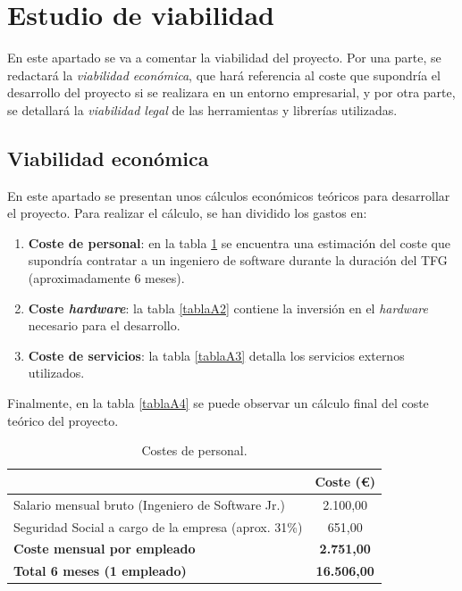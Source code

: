 \section{Estudio de viabilidad}
\label{sec:plan_viabilidad}
En este apartado se va a comentar la viabilidad del proyecto. Por una parte, se redactará la \emph{viabilidad económica}, que hará referencia al coste que supondría el desarrollo del proyecto si se realizara en un entorno empresarial, y por otra parte, se detallará la \emph{viabilidad legal} de las herramientas y librerías utilizadas.

\subsection{Viabilidad económica}
En este apartado se presentan unos cálculos económicos teóricos para desarrollar el proyecto. Para realizar el cálculo, se han dividido los gastos en:
\begin{enumerate}
    \item \textbf{Coste de personal}: en la tabla \ref{tablaA1} se encuentra una estimación del coste que supondría contratar a un ingeniero de software durante la duración del TFG (aproximadamente 6 meses).
    \item \textbf{Coste \textit{hardware}}: la tabla \ref{tablaA2} contiene la inversión en el \textit{hardware} necesario para el desarrollo.
    \item \textbf{Coste de servicios}: la tabla \ref{tablaA3} detalla los servicios externos utilizados.
\end{enumerate}
Finalmente, en la tabla \ref{tablaA4} se puede observar un cálculo final del coste teórico del proyecto.

\begin{table}[H]
    \centering
    \begin{tabular}{lc}
        \hline
        \rowcolor[HTML]{EFEFEF} 
        \multicolumn{1}{c}{\cellcolor[HTML]{EFEFEF}\textbf{Concepto}} & \textbf{Coste (€)} \\ \hline
        \rowcolor[HTML]{ECF4FF} 
        Salario mensual bruto (Ingeniero de Software Jr.) \cite{salariales_tic} & 2.100,00 \\
        \rowcolor[HTML]{EFEFEF} 
        Seguridad Social a cargo de la empresa (aprox. 31\%) & 651,00 \\ \hline
        \rowcolor[HTML]{ECF4FF} 
        \textbf{Coste mensual por empleado} & \textbf{2.751,00} \\ \hline
        \rowcolor[HTML]{EFEFEF} 
        \textbf{Total 6 meses (1 empleado)} & \textbf{16.506,00} \\ \hline
    \end{tabular}
    \caption{Costes de personal.}
    \label{tablaA1}
\end{table}

